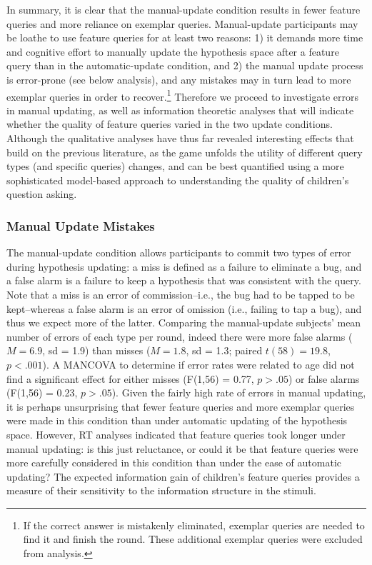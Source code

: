 \documentclass[man,floatsintext]{apa6}
\begin{document}
 In summary, it is clear that the manual-update condition results in fewer feature 
queries and more reliance on exemplar queries. 
Manual-update participants may be loathe to use feature queries for at least two reasons: 1) it demands more time and cognitive effort to manually update the hypothesis space after a feature query than 
in the automatic-update condition, and 2) the manual update process is error-prone (see below analysis), 
and any mistakes may in turn lead to more exemplar queries in order to recover.\footnote{If the correct answer is mistakenly eliminated, exemplar queries are needed to find it and finish the round. These additional exemplar queries were excluded from analysis.} Therefore we proceed to investigate errors in manual updating, as well as information theoretic analyses that will indicate whether the quality of feature queries varied in the two update conditions. Although the qualitative analyses have thus far revealed interesting effects that build on the previous literature, as the game unfolds the utility of different query types (and specific queries) changes, and can be best quantified using a more sophisticated model-based approach to understanding the quality of children's question asking.

\subsubsection{Manual Update Mistakes}

The manual-update condition allows participants to commit two types of error during 
hypothesis updating: a miss is defined as a failure to eliminate a bug, and a false 
alarm is a failure to keep a hypothesis that was consistent with the query. Note that 
a miss is an error of commission--i.e., the bug had to be tapped to be kept--whereas 
a false alarm is an error of omission (i.e., failing to tap a bug), and thus we expect 
more of the latter. Comparing the manual-update subjects' mean number of errors of 
each type per round, indeed there were more false alarms ($M=6.9$, sd = 1.9) than 
misses ($M=1.8$, sd = 1.3; paired $t(58) = 19.8$, $p<.001$). A MANCOVA to 
determine if error rates were related to age did not find a significant effect for either 
misses (F(1,56) = 0.77, $p>.05$) or false alarms (F(1,56) = 0.23, $p>.05$). Given 
the fairly high rate of errors in manual updating, it is perhaps unsurprising that fewer 
feature queries and more exemplar queries were made in this condition than under 
automatic updating of the hypothesis space. However, RT analyses indicated that 
feature queries took longer under manual updating: is this just reluctance, or could it 
be that feature queries were more carefully considered in this condition than under 
the ease of automatic updating? The expected information gain of children's feature queries provides a measure of their sensitivity to the information structure in the stimuli.
\end{document}
